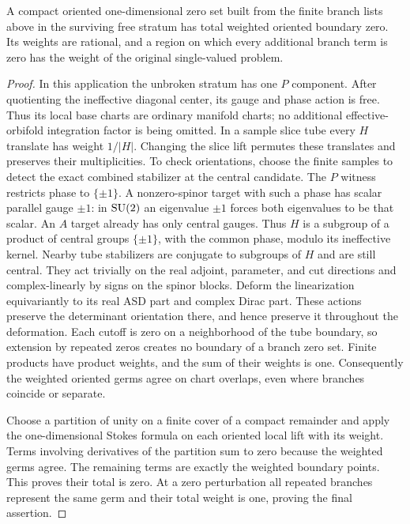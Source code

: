 \begin{lemma}\label{lem:analysis:stokes}
A compact oriented one-dimensional zero set built from the finite
branch lists above in the surviving free stratum has total weighted
oriented boundary zero.  Its
weights are rational, and a region on which every additional branch
term is zero has the weight of the original single-valued problem.
\end{lemma}
\begin{proof}
In this application the unbroken stratum has one $P$ component.
After quotienting the ineffective diagonal center, its gauge and
phase action is free.  Thus its local base charts are ordinary
manifold charts; no additional effective-orbifold integration factor
is being omitted.
In a sample slice tube every $H$ translate has weight $1/|H|$.
Changing the slice lift permutes these translates and preserves their
multiplicities.  To check orientations, choose the finite samples to
detect the exact combined stabilizer at the central candidate.  The
$P$ witness restricts phase to $\{\pm1\}$.  A nonzero-spinor target
with such a phase has scalar parallel gauge $\pm1$: in $\operatorname{SU}(2)$
an eigenvalue $\pm1$ forces both eigenvalues to be that scalar.
An $A$ target already has only central gauges.  Thus $H$ is a
subgroup of a product of central groups $\{\pm1\}$, with the
common phase, modulo its ineffective kernel.  Nearby tube stabilizers
are conjugate to subgroups of $H$ and are still central.  They act
trivially on the real adjoint, parameter, and cut directions and
complex-linearly by signs on the spinor blocks.  Deform the
linearization equivariantly to its real ASD part and complex Dirac
part.  These actions preserve the determinant orientation there,
and hence preserve it throughout the deformation.  Each cutoff is
zero on a neighborhood of the tube boundary, so extension by repeated
zeros creates no boundary of a branch zero set.  Finite products have
product weights, and the sum of their weights is one.  Consequently
the weighted oriented germs agree on chart overlaps, even where
branches coincide or separate.

Choose a partition of unity on a finite cover of a compact remainder
and apply the one-dimensional Stokes formula on each oriented local
lift with its weight.  Terms involving derivatives of the partition
sum to zero because the weighted germs agree.  The remaining terms
are exactly the weighted boundary points.  This proves their total
is zero.  At a zero perturbation all repeated branches represent the
same germ and their total weight is one, proving the final assertion.
\end{proof}

